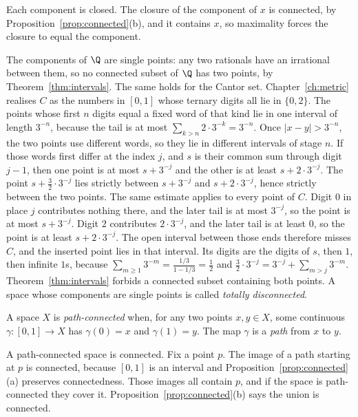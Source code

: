 Each component is closed. The closure of the component of $x$ is connected, by Proposition~\ref{prop:connected}(b), and it contains $x$, so maximality forces the closure to equal the component.

The components of $\Q$ are single points: any two rationals have an irrational between them, so no connected subset of $\Q$ has two points, by Theorem~\ref{thm:intervals}. The same holds for the Cantor set. Chapter~\ref{ch:metric} realises $C$ as the numbers in $[0,1]$ whose ternary digits all lie in $\{0,2\}$. The points whose first $n$ digits equal a fixed word of that kind lie in one interval of length $3^{-n}$, because the tail is at most $\sum_{k>n}2\cdot 3^{-k}=3^{-n}$. Once $|x-y|>3^{-n}$, the two points use different words, so they lie in different intervals of stage $n$. If those words first differ at the index $j$, and $s$ is their common sum through digit $j-1$, then one point is at most $s+3^{-j}$ and the other is at least $s+2\cdot 3^{-j}$. The point $s+\frac32\cdot 3^{-j}$ lies strictly between $s+3^{-j}$ and $s+2\cdot 3^{-j}$, hence strictly between the two points. The same estimate applies to every point of $C$. Digit $0$ in place $j$ contributes nothing there, and the later tail is at most $3^{-j}$, so the point is at most $s+3^{-j}$. Digit $2$ contributes $2\cdot 3^{-j}$, and the later tail is at least $0$, so the point is at least $s+2\cdot 3^{-j}$. The open interval between those ends therefore misses $C$, and the inserted point lies in that interval. Its digits are the digits of $s$, then $1$, then infinite $1$s, because $\sum_{m\ge1}3^{-m}=\frac{1/3}{1-1/3}=\frac12$ and $\frac32\cdot 3^{-j}=3^{-j}+\sum_{m>j}3^{-m}$. Theorem~\ref{thm:intervals} forbids a connected subset containing both points. A space whose components are single points is called \emph{totally disconnected}.

\begin{definition}
A space $X$ is \emph{path-connected} when, for any two points $x,y\in X$, some continuous $\gamma:[0,1]\to X$ has $\gamma(0)=x$ and $\gamma(1)=y$. The map $\gamma$ is a \emph{path} from $x$ to $y$.
\end{definition}

A path-connected space is connected. Fix a point $p$. The image of a path starting at $p$ is connected, because $[0,1]$ is an interval and Proposition~\ref{prop:connected}(a) preserves connectedness. Those images all contain $p$, and if the space is path-connected they cover it. Proposition~\ref{prop:connected}(b) says the union is connected.

